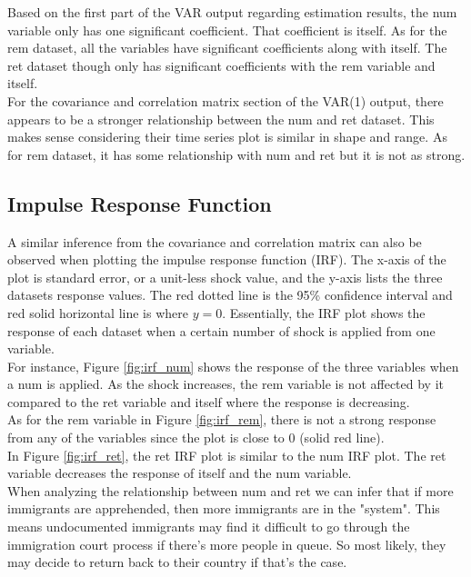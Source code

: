 \documentclass[a4paper]{article}
\begin{document}
Based on the first part of the VAR output regarding estimation results, the num variable only has one significant coefficient. That coefficient is itself. As for the rem dataset, all the variables have significant coefficients along with itself. The ret dataset though only has significant coefficients with the rem variable and itself. \\

For the covariance and correlation matrix section of the VAR(1) output, there appears to be a stronger relationship between the num and ret dataset. This makes sense considering their time series plot is similar in shape and range. As for rem dataset, it has some relationship with num and ret but it is not as strong.

\subsection{Impulse Response Function}
A similar inference from the covariance and correlation matrix can also be observed when plotting the impulse response function (IRF). The x-axis of the plot is standard error, or a unit-less shock value, and the y-axis lists the three datasets response values. The red dotted line is the 95\% confidence interval and red solid horizontal line is where $y=0$. Essentially, the IRF plot shows the response of each dataset when a certain number of shock is applied from one variable. \\

For instance, Figure \ref{fig:irf_num} shows the response of the three variables when a num is applied. As the shock increases, the rem variable is not affected by it compared to the ret variable and itself where the response is decreasing. \\

As for the rem variable in Figure \ref{fig:irf_rem}, there is not a strong response from any of the variables since the plot is close to 0 (solid red line). \\

In Figure \ref{fig:irf_ret}, the ret IRF plot is similar to the num IRF plot. The ret variable decreases the response of itself and the num variable. \\

When analyzing the relationship between num and ret we can infer that if more immigrants are apprehended, then more immigrants are in the "system". This means undocumented immigrants may find it difficult to go through the immigration court process if there’s more people in queue. So most likely, they may decide to return back to their country if that's the case.
\end{document}
